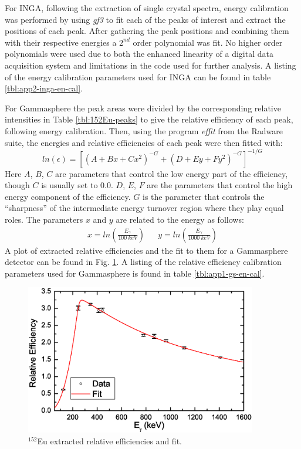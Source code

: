For INGA, following the extraction of single crystal spectra, energy calibration was performed by using \emph{gf3} to fit each of the peaks of interest and extract the positions of each peak. After gathering the peak positions and combining them with their respective energies a $2^{nd}$ order polynomial was fit. No higher order polynomials were used due to both the enhanced linearity of a digital data acquisition system and limitations in the code used for further analysis. A listing of the energy calibration parameters used for INGA can be found in table \ref{tbl:app2-inga-en-cal}.

For Gammasphere the peak areas were divided by the corresponding relative intensities in Table \ref{tbl:152Eu-peaks} to give the relative efficiency of each peak, following energy calibration. Then, using the program \emph{effit} from the Radware suite, the energies and relative efficiencies of each peak were then fitted with:
\begin{equation}
\label{eqn:chp3-eff_cal} 
ln(\epsilon) = [(A+Bx+Cx^2)^{-G} + (D+Ey+Fy^2)^{-G}]^{-1/G}
\end{equation}
Here $A$, $B$, $C$ are parameters that control the low energy part of the efficiency, though $C$ is usually set to $0.0$. $D$, $E$, $F$ are the parameters that control the high energy component of the efficiency. $G$ is the parameter that controls the ``sharpness'' of the intermediate energy turnover region where they play equal roles. The parameters $x$ and $y$ are related to the \gr{} energy as follows:
\begin{align*}
\label{eqn:chp3-eff_x_and_y}
x=ln(\frac{E_{\gamma{}}}{100~keV}) && y=ln(\frac{E_{\gamma{}}}{1000~keV})
\end{align*}
A plot of extracted relative efficiencies and the fit to them for a Gammasphere detector can be found in Fig. \ref{fig:chp3-gs-eff-plot}. A listing of the relative efficiency calibration parameters used for Gammasphere is found in table \ref{tbl:app1-gs-en-cal}.

\begin{figure}[h!]
	\centerline{\includegraphics[width=0.9\textwidth]{./img/c3/gs_eff_plot.eps}}
	\caption{$^{152}$Eu extracted relative efficiencies and fit.}
	\label{fig:chp3-gs-eff-plot}
\end{figure}

